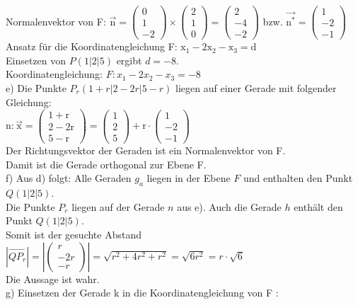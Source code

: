 \documentclass[10pt]{article}
\begin{document}
Normalenvektor von F: $\overrightarrow{\mathrm{n}}=\left(\begin{array}{c}0 \\ 1 \\ -2\end{array}\right) \times\left(\begin{array}{l}2 \\ 1 \\ 0\end{array}\right)=\left(\begin{array}{c}2 \\ -4 \\ -2\end{array}\right)$ bzw. $\overrightarrow{\mathrm{n}^{*}}=\left(\begin{array}{c}1 \\ -2 \\ -1\end{array}\right)$\\
Ansatz für die Koordinatengleichung F: $\mathrm{x}_{1}-2 \mathrm{x}_{2}-\mathrm{x}_{3}=\mathrm{d}$\\
Einsetzen von $P(1|2| 5)$ ergibt $d=-8$.\\
Koordinatengleichung: $F: x_{1}-2 x_{2}-x_{3}=-8$\\
e) Die Punkte $P_{r}(1+r|2-2 r| 5-r)$ liegen auf einer Gerade mit folgender Gleichung:\\
$\mathrm{n}: \overrightarrow{\mathrm{x}}=\left(\begin{array}{c}1+\mathrm{r} \\ 2-2 \mathrm{r} \\ 5-\mathrm{r}\end{array}\right)=\left(\begin{array}{l}1 \\ 2 \\ 5\end{array}\right)+\mathrm{r} \cdot\left(\begin{array}{c}1 \\ -2 \\ -1\end{array}\right)$\\
Der Richtungsvektor der Geraden ist ein Normalenvektor von F.\\
Damit ist die Gerade orthogonal zur Ebene F.\\
f) Aus d) folgt: Alle Geraden $g_{a}$ liegen in der Ebene $F$ und enthalten den Punkt $Q(1|2| 5)$.\\
Die Punkte $P_{r}$ liegen auf der Gerade $n$ aus e). Auch die Gerade $h$ enthält den Punkt $Q(1|2| 5)$.\\
Somit ist der gesuchte Abstand $\left|\overrightarrow{Q P_{r}}\right|=\left|\left(\begin{array}{c}r \\ -2 r \\ -r\end{array}\right)\right|=\sqrt{r^{2}+4 r^{2}+r^{2}}=\sqrt{6 r^{2}}=r \cdot \sqrt{6}$\\
Die Aussage ist wahr.\\
g) Einsetzen der Gerade k in die Koordinatengleichung von F :
\end{document}
